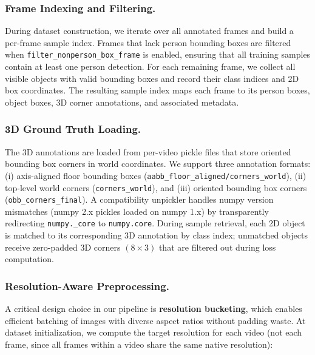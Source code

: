 \documentclass[runningheads]{llncs}
\begin{document}
\subsubsection{Frame Indexing and Filtering.}
During dataset construction, we iterate over all annotated frames and build a per-frame sample index.
Frames that lack person bounding boxes are filtered when \texttt{filter\_nonperson\_box\_frame} is enabled, ensuring that all training samples contain at least one person detection.
For each remaining frame, we collect all visible objects with valid bounding boxes and record their class indices and 2D box coordinates.
The resulting sample index maps each frame to its person boxes, object boxes, 3D corner annotations, and associated metadata.

\subsubsection{3D Ground Truth Loading.}
The 3D annotations are loaded from per-video pickle files that store oriented bounding box corners in world coordinates.
We support three annotation formats: (i) axis-aligned floor bounding boxes (\texttt{aabb\_floor\_aligned/corners\_world}), (ii) top-level world corners (\texttt{corners\_world}), and (iii) oriented bounding box corners (\texttt{obb\_corners\_final}).
A compatibility unpickler handles numpy version mismatches (numpy 2.x pickles loaded on numpy 1.x) by transparently redirecting \texttt{numpy.\_core} to \texttt{numpy.core}.
During sample retrieval, each 2D object is matched to its corresponding 3D annotation by class index; unmatched objects receive zero-padded 3D corners $(8 \times 3)$ that are filtered out during loss computation.

\subsubsection{Resolution-Aware Preprocessing.}
\label{sec:resolution_bucketing}
A critical design choice in our pipeline is \textbf{resolution bucketing}, which enables efficient batching of images with diverse aspect ratios without padding waste.
At dataset initialization, we compute the target resolution for each video (not each frame, since all frames within a video share the same native resolution):
\end{document}
